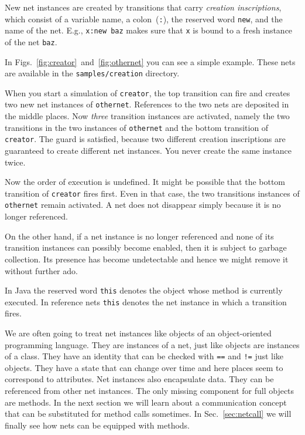 New net instances are created by transitions that carry
\emph{creation inscriptions}, which consist of a variable name,
a colon~(\texttt{:}), the reserved word \texttt{new}, and
the name of the net. E.g., \texttt{x:new baz} makes sure that
\texttt{x} is bound to a fresh instance of the net \texttt{baz}.

In Figs.\ \ref{fig:creator}~and~\ref{fig:othernet} you can see
a simple example. These nets are available in the \texttt{samples/creation}
directory.


When you start a simulation of \texttt{creator}, the top transition
can fire and creates two new net instances of \texttt{othernet}.
References to the two nets are deposited in the middle places.
Now \emph{three} transition instances are activated, namely
the two transitions in the two instances of \texttt{othernet} and
the bottom transition of \texttt{creator}. The guard is satisfied, because
two different creation inscriptions are guaranteed to create different
net instances. You never create the same instance twice.

Now the order of execution is undefined. It might be possible
that the bottom transition of \texttt{creator} fires first.
Even in that case, the two transitions instances of \texttt{othernet}
remain activated. A net does not disappear simply because it is no
longer referenced.

On the other hand, if a net instance is no longer referenced and none
of its transition instances can possibly become enabled, then it
is subject to garbage collection. Its presence has become undetectable
and hence we might remove it without further ado.

In Java the reserved word \texttt{this} denotes the object whose method
is currently executed. In reference nets \texttt{this} denotes
the net instance in which a transition fires.

We are often going to treat net instances like objects of an object-oriented
programming language. They are instances of a net, just like objects
are instances of a class. They have an identity that can be checked
with \texttt{==} and \texttt{!=} just like objects. They have a state
that can change over time and here places seem to correspond to
attributes. Net instances also encapsulate data. They can be referenced
from other net instances. The only missing component for full objects
are methods. In the next section we will learn about a communication
concept that can be substituted for method calls sometimes.
In Sec.~\ref{sec:netcall} we will finally see how nets can be equipped with
methods.


